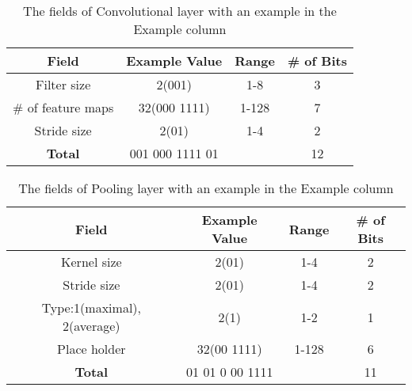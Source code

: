 \documentclass[conference]{IEEEtran}
\begin{document}
\begin{table}[!t]
	\renewcommand{\arraystretch}{1.3}
	\caption{The fields of Convolutional layer with an example in the Example column}
	\label{table:ConvFields}
	\centering
	\begin{tabular}{|c|c|c|c|}
		\hline
		Field & Example Value & Range & \# of Bits\\
		\hline
		Filter size & 2(001) & 1-8 & 3\\
		\hline
		\# of feature maps & 32(000 1111) & 1-128 & 7\\
		\hline
		Stride size & 2(01) & 1-4 & 2\\
		\hline
		\textbf{Total} & 001 000 1111 01 &  & 12\\
		\hline
	\end{tabular}
\end{table}


\begin{table}[!t]
	\renewcommand{\arraystretch}{1.3}
	\caption{The fields of Pooling layer with an example in the Example column}
	\label{table:PoolingFields}
	\centering
	\begin{tabular}{|c|c|c|c|}
		\hline
		Field & Example Value & Range & \# of Bits\\
		\hline
		Kernel size & 2(01) & 1-4 & 2\\
		\hline
		Stride size & 2(01) & 1-4 & 2\\
		\hline
		Type:1(maximal), 2(average) & 2(1) & 1-2 & 1\\
		\hline
		Place holder & 32(00 1111) & 1-128 & 6\\
		\hline
		\textbf{Total} & 01 01 0 00 1111 &  & 11\\
		\hline
	\end{tabular}
\end{table}
\end{document}
